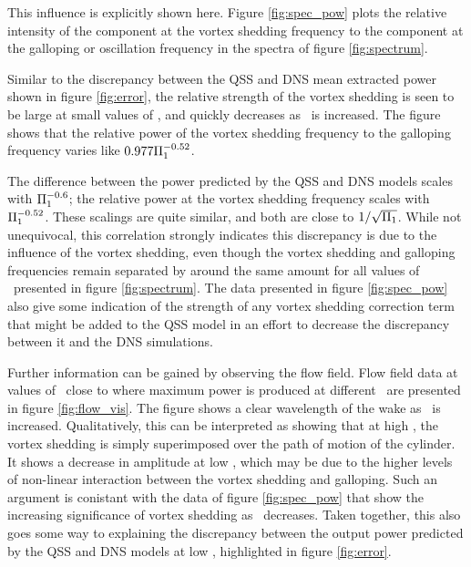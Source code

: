 This influence is explicitly shown here. Figure \ref{fig:spec_pow} plots the relative intensity of the component at the vortex shedding frequency to the component at the galloping or oscillation frequency in the spectra of figure \ref{fig:spectrum}.





Similar to the discrepancy between the QSS and DNS mean extracted power shown in figure \ref{fig:error}, the relative strength of the vortex shedding is seen to be large at small values of \massstiff, and quickly decreases as \massstiff\ is increased. The figure shows that the relative power of the vortex shedding frequency to the galloping frequency varies like $0.977\Pi_1^{-0.52}$.

The difference between the power predicted by the QSS and DNS models scales with $\Pi_1^{-0.6}$; the relative power at the vortex shedding frequency scales with $\Pi_1^{-0.52}$. These scalings are quite similar, and both are close to $1/\sqrt{\Pi_1}$. While not unequivocal, this correlation strongly indicates this discrepancy is due to the influence of the vortex shedding, even though the vortex shedding and galloping frequencies remain separated by around the same amount for all values of \massstiff\ presented in figure \ref{fig:spectrum}. The data presented in figure \ref{fig:spec_pow} also give some indication of the strength of any vortex shedding correction term that might be added to the QSS model in an effort to decrease the discrepancy between it and the DNS simulations.



Further information can be gained by observing the flow field. Flow field data at values of \massdamp\ close to where maximum power is produced at different \massstiff\ are presented in figure \ref{fig:flow_vis}. The figure shows a clear wavelength of the wake as \massstiff \ is increased. Qualitatively, this can be interpreted as showing that at high \massstiff, the vortex shedding is simply superimposed over the path of motion of the cylinder. It shows a decrease in amplitude at low \massstiff, which may be due to the higher levels of non-linear interaction between the vortex shedding and galloping. Such an argument is conistant with the data of figure \ref{fig:spec_pow} that show the increasing significance of vortex shedding as \massstiff\ decreases. Taken together, this also goes some way to explaining the discrepancy between the output power predicted by the QSS and DNS models at low \massstiff, highlighted in figure \ref{fig:error}.





    


